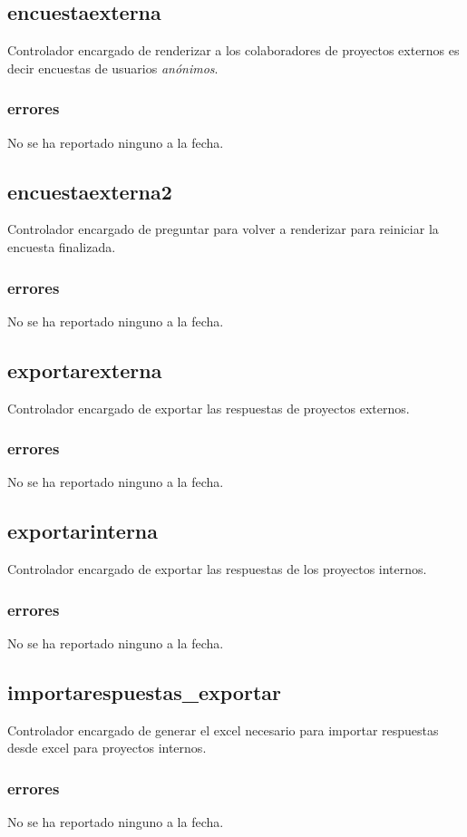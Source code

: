 \documentclass[10pt,a4paper]{book}
\begin{document}
	\subsection{encuestaexterna}
	Controlador encargado de renderizar a los colaboradores de proyectos externos es decir encuestas de usuarios \textit{anónimos}.
	\subsubsection{errores}
	No se ha reportado ninguno a la fecha.
	
	\subsection{encuestaexterna2}
	Controlador encargado de preguntar para volver a renderizar para reiniciar la encuesta finalizada.
	\subsubsection{errores}
	No se ha reportado ninguno a la fecha.
	
	\subsection{exportarexterna}
	Controlador encargado de exportar las respuestas de proyectos externos.
	\subsubsection{errores}
	No se ha reportado ninguno a la fecha.
	
	\subsection{exportarinterna}
	Controlador encargado de exportar las respuestas de los proyectos internos.
	\subsubsection{errores}
	No se ha reportado ninguno a la fecha.
	
	\subsection{importarespuestas\_exportar}
	Controlador encargado de generar el excel necesario para importar respuestas desde excel para proyectos internos.
	\subsubsection{errores}
	No se ha reportado ninguno a la fecha. 
	
\end{document}
